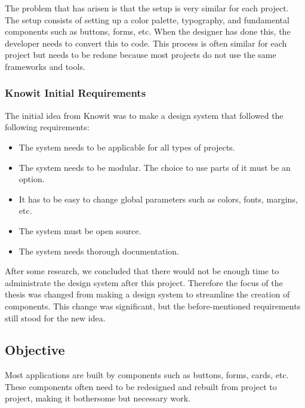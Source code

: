 The problem that has arisen is that the setup is very similar for each project. The setup consists of setting up a color palette, typography, and fundamental components such as buttons, forms, etc. When the designer has done this, the developer needs to convert this to code. This process is often similar for each project but needs to be redone because most projects do not use the same frameworks and tools. 

\subsubsection{Knowit Initial Requirements}%
\label{ssub:Knowit Initial Requirements}
The initial idea from Knowit was to make a design system\cite{fanguyComprehensiveGuideDesign} that followed the following requirements:
\begin{itemize}
  \item The system needs to be applicable for all types of projects.
  \item The system needs to be modular. The choice to use parts of it must be an option.
  \item It has to be easy to change global parameters such as colors, fonts, margins, etc.
  \item The system must be open source.
  \item The system needs thorough documentation.
\end{itemize}

After some research, we concluded that there would not be enough time to administrate the design system after this project. Therefore the focus of the thesis was changed from making a design system to streamline the creation of components. This change was significant, but the before-mentioned requirements still stood for the new idea. 



\subsection{Objective}
\label{sub:Objective}
Most applications are built by components such as buttons, forms, cards\cite{babichSimpleDesignTips2020}, etc. These components often need to be redesigned and rebuilt from project to project, making it bothersome but necessary work. 

